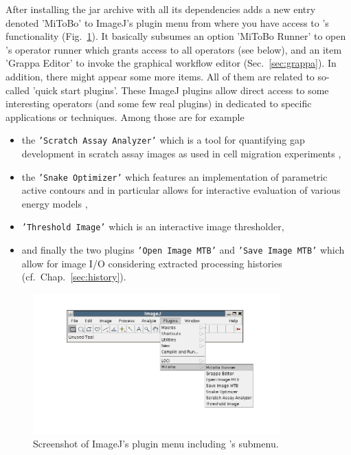 After installing the \mitobo jar archive with all its dependencies \mitobo adds a new entry 
denoted 'MiToBo' to ImageJ's plugin menu from where you have access to \mitobo's functionality 
(Fig.~\ref{fig:imageJ}). It basically subsumes an option 'MiToBo Runner' to open \mitobo's 
operator runner which grants access to all \mitobo operators (see below), and an item 
'Grappa Editor' to invoke the graphical workflow editor (Sec.~\ref{sec:grappa}). In
addition, there might appear some more items. All of them are related to so-called 'quick start
plugins'. These ImageJ plugins allow direct access to some interesting operators (and some few
real plugins) in \mitobo 
dedicated to specific applications or techniques. Among those are for example
\begin{itemize}
  \item the {\tt 'Scratch Assay Analyzer'} which is a tool for quantifying gap development in 
  	scratch assay images as used in cell migration experiments \cite{Glass12_PR, Glass12_ImageJ},
  \item the {\tt 'Snake Optimizer'} which features an implementation of parametric active contours
  	and in particular allows for interactive evaluation of various energy models
  	\cite{Moeller12_IJ},
  \item {\tt 'Threshold Image'} which is an interactive image thresholder,
  \item and finally the two plugins {\tt 'Open Image MTB'} and {\tt 'Save Image MTB'} which allow
  	for image I/O considering extracted processing histories (cf.~Chap.~\ref{sec:history}).  
\end{itemize} 
\begin{center}
\begin{figure}[t]
\begin{center}
\includegraphics[width=0.85\textwidth,clip,trim= 0 0 0 30]{../images/ScreenshotImageJ_trans.png}
\vspace*{-1.7cm}
\caption{\label{fig:imageJ}Screenshot of ImageJ's plugin menu including \mitobo's submenu.}
\end{center}
\vspace*{-0.25cm}
\end{figure}
\end{center}

